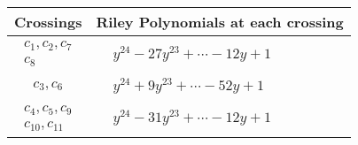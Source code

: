 \documentclass[1p]{elsarticle_modified}
\theoremstyle{definition}
\begin{document}
\begin{tabular}{m{50pt}|m{274pt}}
Crossings & \hspace{64pt}Riley Polynomials at each crossing \\
\hline $$\begin{aligned}c_{1},c_{2},c_{7}\\c_{8}\end{aligned}$$&$\begin{aligned}
&y^{24}-27 y^{23}+\cdots-12 y+1
\end{aligned}$\\
\hline $$\begin{aligned}c_{3},c_{6}\end{aligned}$$&$\begin{aligned}
&y^{24}+9 y^{23}+\cdots-52 y+1
\end{aligned}$\\
\hline $$\begin{aligned}c_{4},c_{5},c_{9}\\c_{10},c_{11}\end{aligned}$$&$\begin{aligned}
&y^{24}-31 y^{23}+\cdots-12 y+1
\end{aligned}$\\
\hline
\end{tabular}
\vskip 2pc
\end{document}
